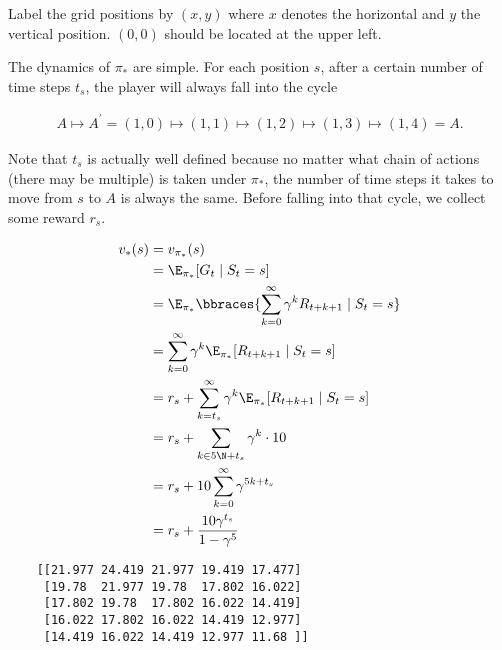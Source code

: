\begin{solution}

Label the grid positions by $(x, y)$ where $x$ denotes the horizontal and $y$ the vertical position.
$(0, 0)$ should be located at the upper left.

The dynamics of $\pi_\ast$ are simple.
For each position $s$, after a certain number of time steps $t_s$, the player will always fall into the cycle

\begin{align*}
    A \mapsto A^\prime = (1, 0)
      \mapsto (1, 1)
      \mapsto (1, 2)
      \mapsto (1, 3)
      \mapsto (1, 4) = A.
\end{align*}

Note that $t_s$ is actually well defined because no matter what chain of actions (there may be multiple) is taken under $\pi_\ast$, the number of time steps it takes to move from $s$ to $A$ is always the same.
Before falling into that cycle, we collect some reward $r_s$.

\begin{align*}
    v_\ast(s)
    & =
    v_{\pi_\ast}(s) \\
    & =
    \E_{\pi_\ast}[G_t \mid S_t = s] \\
    & =
    \E_{\pi_\ast}
    \bbraces
    {
        \sum_{k=0}^\infty
            \gamma^k R_{t+k+1}
        \mid
        S_t = s
    } \\
    & =
    \sum_{k=0}^\infty
        \gamma^k \E_{\pi_\ast}[R_{t+k+1} \mid S_t = s] \\
    & =
    r_s
    +
    \sum_{k = t_s}^\infty
        \gamma^k \E_{\pi_\ast}[R_{t+k+1} \mid S_t = s] \\
    & =
    r_s
    +
    \sum_{k \in 5 \N + t_s}
        \gamma^k \cdot 10 \\
    & =
    r_s + 10 \sum_{k=0}^\infty \gamma^{5 k + t_s} \\
    & =
    r_s + \frac{10 \gamma^{t_s}}{1 - \gamma^5}
\end{align*}

\begin{verbatim}
    [[21.977 24.419 21.977 19.419 17.477]
     [19.78  21.977 19.78  17.802 16.022]
     [17.802 19.78  17.802 16.022 14.419]
     [16.022 17.802 16.022 14.419 12.977]
     [14.419 16.022 14.419 12.977 11.68 ]]
\end{verbatim}

\end{solution}

